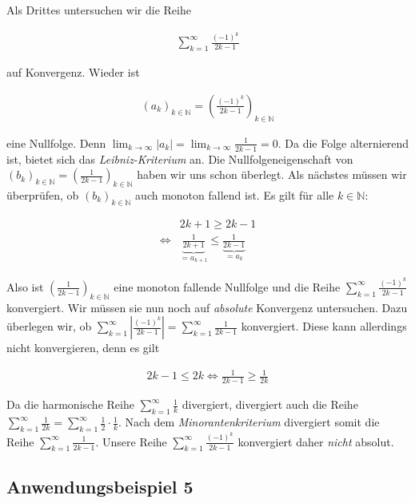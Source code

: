 \documentclass[fontsize=9pt,
               parskip=half-,
               DIV=14,
               listof=chapterentry,
               tocflat]{scrbook}
\begin{document}
Als Drittes untersuchen wir die Reihe

\begin{align*}
\sum _{k=1}^{\infty }{\frac {(-1)^{k}}{2k-1}}
\end{align*}

auf Konvergenz. Wieder ist

\begin{align*}
(a_{k})_{k\in \mathbb {N} }=\left({\frac {(-1)^{k}}{2k-1}}\right)_{k\in \mathbb {N} }
\end{align*}

eine Nullfolge. Denn $\lim _{k\to \infty }|a_{k}|=\lim _{k\to \infty }{\tfrac {1}{2k-1}}=0$. Da die Folge alternierend ist, bietet sich das \emph{Leibniz-Kriterium} an. Die Nullfolgeneigenschaft von $(b_{k})_{k\in \mathbb {N} }=\left({\tfrac {1}{2k-1}}\right)_{k\in \mathbb {N} }$ haben wir uns schon überlegt. Als nächstes müssen wir überprüfen, ob $(b_{k})_{k\in \mathbb {N} }$ auch monoton fallend ist. Es gilt für alle $k\in \mathbb {N} $:

\begin{align*}
&2k+1\geq 2k-1\\[0.5em]\iff &\underbrace {\frac {1}{2k+1}} _{=a_{k+1}}\leq \underbrace {\frac {1}{2k-1}} _{=a_{k}}
\end{align*}

Also ist $\left({\tfrac {1}{2k-1}}\right)_{k\in \mathbb {N} }$ eine monoton fallende Nullfolge und die Reihe $\sum _{k=1}^{\infty }{\tfrac {(-1)^{k}}{2k-1}}$ konvergiert. Wir müssen sie nun noch auf \emph{absolute} Konvergenz untersuchen. Dazu überlegen wir, ob $\sum _{k=1}^{\infty }\left|{\tfrac {(-1)^{k}}{2k-1}}\right|=\sum _{k=1}^{\infty }{\tfrac {1}{2k-1}}$ konvergiert. Diese kann allerdings nicht konvergieren, denn es gilt

\begin{align*}
2k-1\leq 2k\iff {\frac {1}{2k-1}}\geq {\frac {1}{2k}}
\end{align*}

Da die harmonische Reihe $\sum _{k=1}^{\infty }{\tfrac {1}{k}}$ divergiert, divergiert auch die Reihe $\sum _{k=1}^{\infty }{\tfrac {1}{2k}}=\sum _{k=1}^{\infty }{\tfrac {1}{2}}\cdot {\tfrac {1}{k}}$. Nach dem \emph{Minorantenkriterium} divergiert somit die Reihe $\sum _{k=1}^{\infty }{\tfrac {1}{2k-1}}$. Unsere Reihe $\sum _{k=1}^{\infty }{\tfrac {(-1)^{k}}{2k-1}}$ konvergiert daher \emph{nicht} absolut.

\subsection{Anwendungsbeispiel 5}
\end{document}
